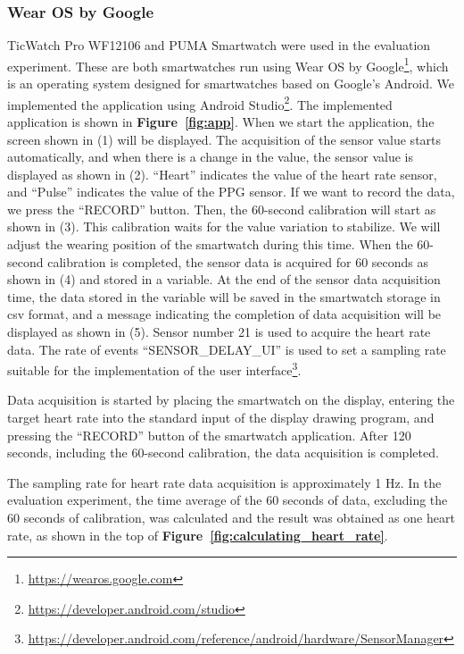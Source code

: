 \documentclass[sigchi,authordraft]{acmart}
\newcommand\figref[1]{\textbf{Figure~\ref{fig:#1}}}
\begin{document}
\subsubsection{Wear OS by Google}
\label{subsec:wearos}
TicWatch Pro WF12106 and PUMA Smartwatch were used in the evaluation experiment. These are both smartwatches run using Wear OS by Google\footnote{\url{https://wearos.google.com}}, which is an operating system designed for smartwatches based on Google's Android. We implemented the application using Android Studio\footnote{\url{https://developer.android.com/studio}}. The implemented application is shown in \figref{app}. When we start the application, the screen shown in (1) will be displayed. The acquisition of the sensor value starts automatically, and when there is a change in the value, the sensor value is displayed as shown in (2). ``Heart'' indicates the value of the heart rate sensor, and ``Pulse'' indicates the value of the PPG sensor. If we want to record the data, we press the ``RECORD'' button. Then, the 60-second calibration will start as shown in (3). This calibration waits for the value variation to stabilize. We will adjust the wearing position of the smartwatch during this time. When the 60-second calibration is completed, the sensor data is acquired for 60 seconds as shown in (4) and stored in a variable. At the end of the sensor data acquisition time, the data stored in the variable will be saved in the smartwatch storage in csv format, and a message indicating the completion of data acquisition will be displayed as shown in (5). Sensor number 21 is used to acquire the heart rate data. The rate of events ``SENSOR\_DELAY\_UI'' is used to set a sampling rate suitable for the implementation of the user interface\footnote{\url{https://developer.android.com/reference/android/hardware/SensorManager}}.\par

Data acquisition is started by placing the smartwatch on the display, entering the target heart rate into the standard input of the display drawing program, and pressing the ``RECORD'' button of the smartwatch application. After 120 seconds, including the 60-second calibration, the data acquisition is completed.\par

The sampling rate for heart rate data acquisition is approximately 1 Hz. In the evaluation experiment, the time average of the 60 seconds of data, excluding the 60 seconds of calibration, was calculated and the result was obtained as one heart rate, as shown in the top of \figref{calculating_heart_rate}.
\end{document}
